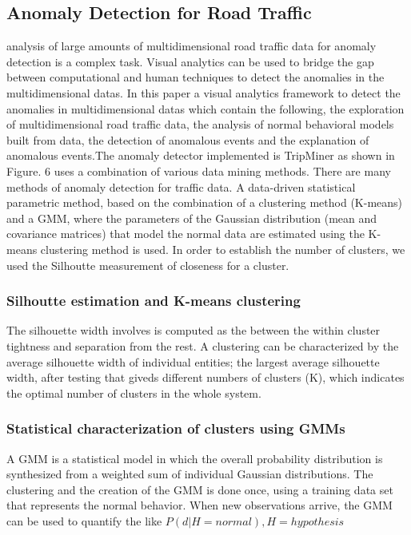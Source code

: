 \documentclass[10pt,a4paper,journal]{IEEEtran}
\begin{document}
\subsection{Anomaly Detection for Road Traffic}
\parThe analysis of large amounts of multidimensional road traffic data for anomaly detection is a complex task. Visual analytics  can be used to bridge the gap between computational and human techniques to detect the anomalies in the multidimensional datas. In this paper a visual analytics framework to detect the anomalies in multidimensional datas which contain the following, the exploration of multidimensional road traffic data, the analysis of normal behavioral models built from data,
the detection of anomalous events and the explanation of anomalous events.The anomaly detector implemented is TripMiner as shown in Figure. 6 uses a combination of various data mining methods. There are many methods of anomaly detection for traffic data. A data-driven statistical parametric method, based on the combination of a clustering method (K-means) and a GMM, where the parameters of the Gaussian distribution (mean and covariance matrices) that model the normal data are estimated using the K-means clustering method is used. In order to establish the number of
clusters, we used the Silhoutte measurement of closeness for a cluster.
\\

\subsubsection{Silhoutte estimation and K-means clustering}
The silhouette  width involves is computed as the  between the within cluster tightness and separation from the rest. A clustering can be characterized by the average silhouette width of individual entities; the largest average
silhouette width, after testing that giveds different numbers of clusters (K), which indicates the optimal number of clusters \cite{10} in the whole system.
\subsubsection{Statistical characterization of clusters using GMMs}
A GMM is a statistical model in which the overall probability
distribution is synthesized from a weighted sum of individual
Gaussian distributions. The clustering and the creation of the GMM \cite{8} is done once, using a training data set that represents the normal behavior.
When new observations arrive, the GMM can be used to
quantify the like $P(d|H = normal), H = hypothesis$
\end{document}

